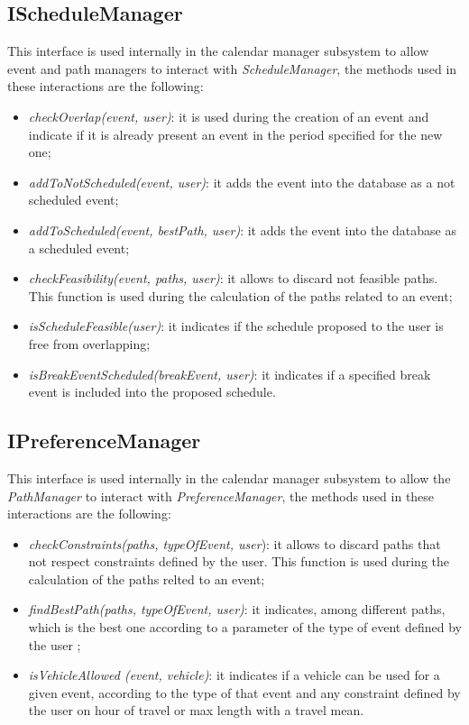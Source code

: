 \subsection{IScheduleManager}
This interface is used internally in the calendar manager subsystem to allow event and path managers to interact with \textit{ScheduleManager}, the methods used in these interactions are the following:
\begin{itemize}
\item \textit{checkOverlap(event, user)}: it is used during the creation of an event and indicate if it is already present an event in the period specified for the new one;
\item \textit{addToNotScheduled(event, user)}: it adds the event into the database as a not scheduled event;
\item \textit{addToScheduled(event, bestPath, user)}: it adds the event into the database as a scheduled event;
\item \textit{checkFeasibility(event, paths, user)}: it allows to discard not feasible paths. This function is used during the calculation of the paths related to an event;
\item \textit{isScheduleFeasible(user)}: it indicates if the schedule proposed to the user is free from overlapping;
\item \textit{isBreakEventScheduled(breakEvent, user)}: it indicates if a specified break event is included into the proposed schedule.
\end{itemize}

\subsection{IPreferenceManager}
This interface is used internally in the calendar manager subsystem to allow the \textit{PathManager} to interact with \textit{PreferenceManager}, the methods used in these interactions are the following:
\begin{itemize}
\item \textit{checkConstraints(paths, typeOfEvent, user}): it allows to discard paths that not respect constraints defined by the user. This function is used during the calculation of the paths relted to an event;
\item \textit{findBestPath(paths, typeOfEvent, user)}: it indicates, among different paths, which is the best one according to a parameter of the type of event defined by the user ;
\item \textit{isVehicleAllowed (event, vehicle)}: it indicates if a vehicle can be used for a given event, according to the type of that event and any constraint defined by the user on hour of travel or max length with a travel mean.
\end{itemize}

